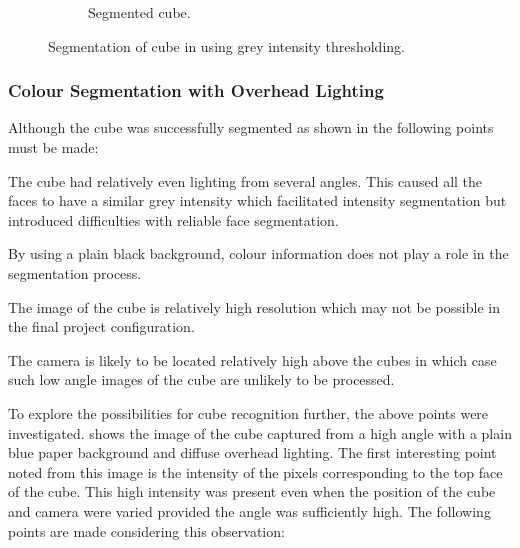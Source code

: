 \begin{figure}[H]
\begin{subfigure}[b]{0.35\textwidth}
        \caption{Segmented cube.}
        \label{fig:original-cube-segment}
   \end{subfigure}
    \captionsetup{singlelinecheck = false, justification=justified}
    \caption{Segmentation of cube in  using grey intensity thresholding.}
    \label{fig:grey-cube-segment}
\end{figure}

\subsubsection{Colour Segmentation with Overhead Lighting}

Although the cube was successfully segmented as shown in  the following points must be made:

\begin{compactitem}
    \item The cube had relatively even lighting from several angles. This caused all the faces to have a similar grey intensity which facilitated intensity segmentation but introduced difficulties with reliable face segmentation.
    \item By using a plain black background, colour information does not play a role in the segmentation process.
    \item The image of the cube is relatively high resolution which may not be possible in the final project configuration.
    \item The camera is likely to be located relatively high above the cubes in which case such low angle images of the cube are unlikely to be processed.
\end{compactitem}

To explore the possibilities for cube recognition further, the above points were investigated.  shows the image of the cube captured from a high angle with a plain blue paper background and diffuse overhead lighting. The first interesting point noted from this image is the intensity of the pixels corresponding to the top face of the cube. This high intensity was present even when the position of the cube and camera were varied provided the angle was sufficiently high. The following points are made considering this observation:


